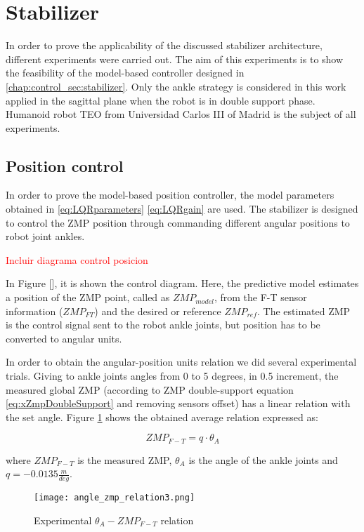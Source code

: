 \section{Stabilizer}
In order to prove the applicability of the discussed stabilizer architecture, different experiments were carried out. The aim of this experiments is to show the feasibility of the model-based controller designed in \ref{chap:control_sec:stabilizer}. Only the ankle strategy is considered in this work applied in the sagittal plane when the robot is in double support phase. Humanoid robot TEO from Universidad Carlos III of Madrid is the subject of all experiments.

\subsection{Position control}
In order to prove the model-based position controller, the model parameters obtained in \eqref{eq:LQRparameters} \eqref{eq:LQRgain} are used. The stabilizer is designed to control the ZMP position through commanding different angular positions to robot joint ankles. 

\textcolor{red}{Incluir diagrama control posicion}

In Figure [], it is shown the control diagram. Here, the predictive model estimates a position of the ZMP point, called as $ZMP_{model}$, from the F-T sensor information ($ZMP_{FT}$) and the desired or reference $ZMP_{ref}$. The estimated ZMP is the control signal sent to the robot ankle joints, but position has to be converted to angular units.

In order to obtain the angular-position units relation we did several experimental trials. Giving to ankle joints angles from 0 to 5 degrees, in 0.5 increment, the measured global ZMP (according to ZMP double-support equation \eqref{eq:xZmpDoubleSupport} and removing sensors offset) has a linear relation with the set angle. Figure \ref{fig:angle_zmp_relation} shows the obtained average relation expressed as:

\begin{equation}
ZMP_{F-T} = q \cdot \theta_A
\end{equation}

where $ZMP_{F-T}$ is the measured ZMP, $\theta_A$ is the angle of the ankle joints and $q=-0.0135 \frac{m}{deg}$.

\begin{figure}[!hbt]
\centering
\texttt{[image: angle\_zmp\_relation3.png]}
\caption{Experimental $\theta_A - ZMP_{F-T}$ relation}
\label{fig:angle_zmp_relation}
\end{figure}

